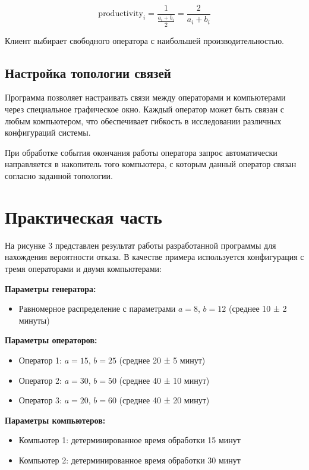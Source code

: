 \begin{equation}
\text{productivity}_i = \frac{1}{\frac{a_i + b_i}{2}} = \frac{2}{a_i + b_i}
\end{equation}

Клиент выбирает свободного оператора с наибольшей производительностью.

\subsection{Настройка топологии связей}

Программа позволяет настраивать связи между операторами и компьютерами через специальное графическое окно. Каждый оператор может быть связан с любым компьютером, что обеспечивает гибкость в исследовании различных конфигураций системы.

При обработке события окончания работы оператора запрос автоматически направляется в накопитель того компьютера, с которым данный оператор связан согласно заданной топологии.

\section{Практическая часть}

На рисунке 3 представлен результат работы разработанной программы для нахождения вероятности отказа. В качестве примера используется конфигурация с тремя операторами и двумя компьютерами:

\textbf{Параметры генератора:}
\begin{itemize}
    \item Равномерное распределение с параметрами $a = 8$, $b = 12$ (среднее 10 ± 2 минуты)
\end{itemize}

\textbf{Параметры операторов:}
\begin{itemize}
    \item Оператор 1: $a = 15$, $b = 25$ (среднее 20 ± 5 минут)
    \item Оператор 2: $a = 30$, $b = 50$ (среднее 40 ± 10 минут)
    \item Оператор 3: $a = 20$, $b = 60$ (среднее 40 ± 20 минут)
\end{itemize}

\textbf{Параметры компьютеров:}
\begin{itemize}
    \item Компьютер 1: детерминированное время обработки 15 минут
    \item Компьютер 2: детерминированное время обработки 30 минут
\end{itemize}

